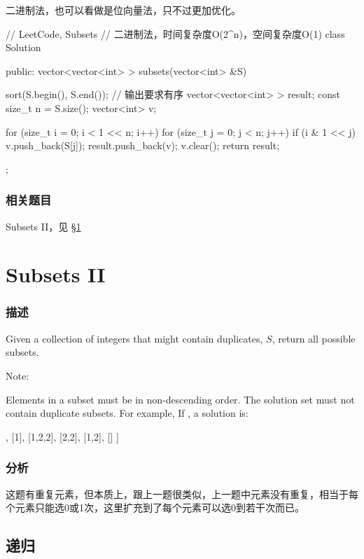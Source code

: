二进制法，也可以看做是位向量法，只不过更加优化。

\begin{Code}
	// LeetCode, Subsets
	// 二进制法，时间复杂度O(2^n)，空间复杂度O(1)
	class Solution {
		public:
		vector<vector<int> > subsets(vector<int> &S) {
			sort(S.begin(), S.end()); // 输出要求有序
			vector<vector<int> > result;
			const size_t n = S.size();
			vector<int> v;
			
			for (size_t i = 0; i < 1 << n; i++) {
				for (size_t j = 0; j < n; j++) {
					if (i & 1 << j) v.push_back(S[j]);
				}
				result.push_back(v);
				v.clear();
			}
			return result;
		}
	};
\end{Code}


\subsubsection{相关题目}
\begindot
\item Subsets II，见 \S \ref{sec:subsets-ii}
\myenddot


\section{Subsets II} %
\label{sec:subsets-ii}


\subsubsection{描述}
Given a collection of integers that might contain duplicates, $S$, return all possible subsets.

Note:

Elements in a subset must be in non-descending order.
The solution set must not contain duplicate subsets.
For example,
If , a solution is:
\begin{Code}
	[
	[2],
	[1],
	[1,2,2],
	[2,2],
	[1,2],
	[]
	]
\end{Code}


\subsubsection{分析}
这题有重复元素，但本质上，跟上一题很类似，上一题中元素没有重复，相当于每个元素只能选0或1次，这里扩充到了每个元素可以选0到若干次而已。


\subsection{递归}


